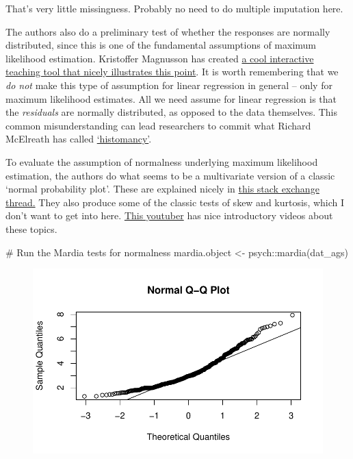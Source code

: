 \documentclass[
  letterpaper,
  DIV=11,
  numbers=noendperiod]{scrreprt}
\newenvironment{Shaded}{\begin{snugshade}}{\end{snugshade}}
\newcommand{\CommentTok}[1]{\textcolor[rgb]{0.37,0.37,0.37}{#1}}
\newcommand{\FunctionTok}[1]{\textcolor[rgb]{0.28,0.35,0.67}{#1}}
\newcommand{\NormalTok}[1]{\textcolor[rgb]{0.00,0.23,0.31}{#1}}
\newcommand{\OtherTok}[1]{\textcolor[rgb]{0.00,0.23,0.31}{#1}}
\newcommand{\SpecialCharTok}[1]{\textcolor[rgb]{0.37,0.37,0.37}{#1}}
\begin{document}
That's very little missingness. Probably no need to do multiple
imputation here.

The authors also do a preliminary test of whether the responses are
normally distributed, since this is one of the fundamental assumptions
of maximum likelihood estimation. Kristoffer Magnusson has created
\href{https://rpsychologist.com/likelihood/}{a cool interactive teaching
tool that nicely illustrates this point}. It is worth remembering that
we \emph{do not} make this type of assumption for linear regression in
general -- only for maximum likelihood estimates. All we need assume for
linear regression is that the \emph{residuals} are normally distributed,
as opposed to the data themselves. This common misunderstanding can lead
researchers to commit what Richard McElreath has called
\href{https://stats.stackexchange.com/questions/515444/histomancy-what-does-mcelreath-propose-we-do-instead}{`histomancy'}.

To evaluate the assumption of normalness underlying maximum likelihood
estimation, the authors do what seems to be a multivariate version of a
classic `normal probability plot'. These are explained nicely in
\href{https://stats.stackexchange.com/questions/218638/understanding-normal-probability-plots}{this
stack exchange thread.} They also produce some of the classic tests of
skew and kurtosis, which I don't want to get into here.
\href{https://www.youtube.com/watch?v=TM033GCU-SY\&t=26s}{This youtuber}
has nice introductory videos about these topics.

\begin{Shaded}
\begin{Highlighting}[]
\CommentTok{\# Run the Mardia tests for normalness}
\NormalTok{mardia.object }\OtherTok{\textless{}{-}}\NormalTok{ psych}\SpecialCharTok{::}\FunctionTok{mardia}\NormalTok{(dat\_ags)}
\end{Highlighting}
\end{Shaded}

\begin{figure}[H]

{\centering \includegraphics{./traditional-cfa-workflow_files/figure-pdf/unnamed-chunk-5-1.pdf}

}

\end{figure}
\end{document}
